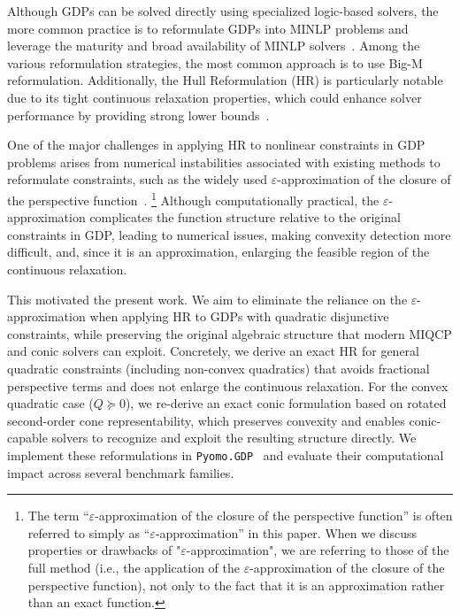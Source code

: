 \documentclass[11pt]{article}
\begin{document}
Although GDPs can be solved directly using specialized logic-based solvers, the more common practice is to reformulate GDPs into MINLP problems and leverage the maturity and broad availability of MINLP solvers~\cite{grossmannReviewNonlinearMixedInteger2002, ovalleLogicBasedDiscreteSteepestDescent2025, ruizGeneralizedDisjunctiveProgramming2012, kronqvist50YearsMixedinteger2025}.
Among the various reformulation strategies,  the most common approach is to use Big-M reformulation. Additionally, the Hull Reformulation (HR) is particularly notable due to its tight continuous relaxation properties, which could enhance solver performance by providing strong lower bounds~\cite{grossmannGeneralizedConvexDisjunctive2003}.

One of the major challenges in applying HR to nonlinear constraints in GDP problems arises from numerical instabilities associated with existing methods to reformulate constraints, such as the widely used \(\varepsilon\)-approximation of the closure of the perspective function~\cite{furmanComputationallyUsefulAlgebraic2020}.
\footnote{The term ``\(\varepsilon\)-approximation of the closure of the perspective function'' is often referred to simply as ``\(\varepsilon\)-approximation'' in this paper.
When we discuss properties or drawbacks of "\(\varepsilon\)-approximation", we are referring to those of the full method (i.e., the application of the $\varepsilon$-approximation of the closure of the perspective function), not only to the fact that it is an approximation rather than an exact function.}
Although computationally practical, the \(\varepsilon\)-approximation complicates the function structure relative to the original constraints in GDP, leading to numerical issues, making convexity detection more difficult, and, since it is an approximation, enlarging the feasible region of the continuous relaxation.



This motivated the present work.
We aim to eliminate the reliance on the $\varepsilon$-approximation when applying HR to GDPs with quadratic disjunctive constraints, while preserving the original algebraic structure that modern MIQCP and conic solvers can exploit.
Concretely, we derive an exact HR for general quadratic constraints (including non-convex quadratics) that avoids fractional perspective terms and does not enlarge the continuous relaxation.
For the convex quadratic case ($Q\succeq 0$), we re-derive an exact conic formulation based on rotated second-order cone representability, which preserves convexity and enables conic-capable solvers to recognize and exploit the resulting structure directly.
We implement these reformulations in \texttt{Pyomo.GDP}~\cite{chenPyomoGDPEcosystemLogic2022} and evaluate their computational impact across several benchmark families.
\end{document}
